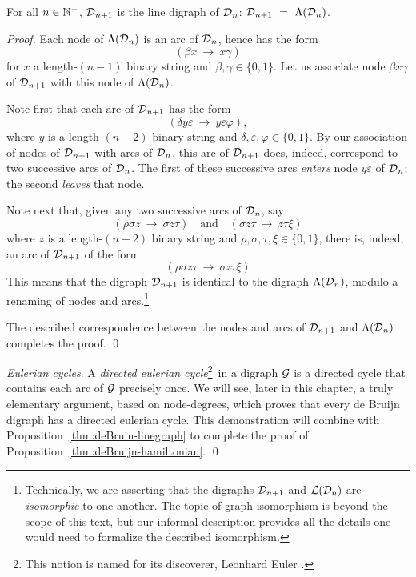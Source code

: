 \begin{prop}
\label{thm:deBruin-linegraph}
For all $n \in \mathbb{N}^+$,
$\mbox{$\cal D$}_{n+1}$ is the line digraph of $\mbox{$\cal D$}_n$: $\d_{n+1} \ = \ \Lambda(\d_n)$.
\end{prop}

\begin{proof}
Each node of $\Lambda(\mbox{$\cal D$}_n)$ is an arc of $\mbox{$\cal D$}_n$, hence has the form
\[ (\beta x \ \rightarrow \ x \gamma) \]
for $x$ a length-$(n-1)$ binary string and $\beta, \gamma \in
\{0,1\}$.  Let us associate node $\beta x \gamma$ of $\mbox{$\cal D$}_{n+1}$ with
this node of $\Lambda(\mbox{$\cal D$}_n)$.

\smallskip

Note first that each arc of $\mbox{$\cal D$}_{n+1}$ has the form
\[ (\delta y \varepsilon \ \rightarrow \ y \varepsilon \varphi), \]
where $y$ is a length-$(n-2)$ binary string and $\delta, \varepsilon,
\varphi \in \{0,1\}$.  By our association of nodes of $\mbox{$\cal D$}_{n+1}$ with
arcs of $\mbox{$\cal D$}_n$, this arc of $\mbox{$\cal D$}_{n+1}$ does, indeed, correspond to two
successive arcs of $\mbox{$\cal D$}_n$.   The first of these successive arcs
{\em enters} node $y \varepsilon$ of $\mbox{$\cal D$}_n$; the second {\em leaves}
that node.

Note next that, given any two successive arcs of $\mbox{$\cal D$}_n$, say
\[
(\rho \sigma z \ \rightarrow \ \sigma z \tau) \ \ \ \mbox { and } \ \ \
(\sigma z \tau \ \rightarrow \  z \tau \xi)
\]
where $z$ is a length-$(n-2)$ binary string and $\rho, \sigma, \tau,
\xi \in \{0,1\}$, there is, indeed, an arc of $\mbox{$\cal D$}_{n+1}$ of the form
\[ (\rho \sigma z \tau \ \rightarrow \ \sigma z \tau \xi) \]
This means that the digraph $\mbox{$\cal D$}_{n+1}$ is identical to the digraph
$\Lambda(\mbox{$\cal D$}_n)$, modulo a renaming of nodes and arcs.\footnote{Technically,
  we are asserting that the digraphs ${\cal D}_{n+1}$ and ${\cal
    L}({\cal D}_n)$ are {\it isomorphic} to one another.  The topic of
  graph isomorphism is beyond the scope of this text, but our informal
  description provides all the details one would need to formalize the
  described isomorphism.}

The described correspondence between the nodes and arcs of $\mbox{$\cal D$}_{n+1}$
and $\Lambda(\mbox{$\cal D$}_n)$ completes the proof.  \qed
\end{proof}

\medskip

{\it Eulerian cycles}. 
A {\it directed eulerian cycle}\footnote{This notion is named for its
  discoverer, Leonhard Euler \index{Euler, Leonhard}.}~in a digraph
$\mbox{$\cal G$}$ is a directed cycle that contains each arc of $\mbox{$\cal G$}$ precisely
once.  We will see, later in this chapter, a truly elementary argument, based
on node-degrees, which proves that every de Bruijn digraph has a directed
eulerian cycle.  This demonstration will combine with
Proposition~\ref{thm:deBruin-linegraph} to complete the proof of
Proposition~\ref{thm:deBruijn-hamiltonian}.  \qed

